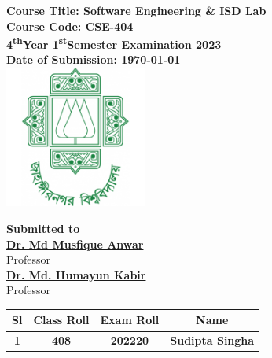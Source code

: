 \documentclass[a4paper,12pt]{article}
\begin{document}
\begin{center}
    \vspace{0.2cm}
    \textbf{\large{Course Title: Software Engineering \& ISD Lab}}\\
    \vspace{0.2cm}
    \textbf{Course Code: CSE-404}\\
    \vspace{0.2cm}
    \textbf{4\textsuperscript{th}Year 1\textsuperscript{st}Semester Examination 2023}\\
    \vspace{0.5cm}
    \textbf{Date of Submission: \today}\\

    \vspace{1.5cm}
    \includegraphics[width=0.35\textwidth]{images/logo.png}\\ %
    \vspace{1cm}

    \textbf{Submitted to}\\
    \vspace{0.2cm}
    \textbf{\href{https://juniv.edu/teachers/musfique.anwar}{Dr. Md Musfique Anwar}}\\
    {Professor}\\
    \vspace{0.2cm}
    \textbf{\href{https://juniv.edu/teachers/hkabir}{Dr. Md. Humayun Kabir}}\\
    {Professor}\\


    \vspace{1cm}

    \begin{table}[h!]
        \centering
        \begin{tabular}{|c|c|c|c|}
            \hline
            \rowcolor[HTML]{2F4F4F} %
            {\color[HTML]{FFFFFF}\textbf{Sl}}& {\color[HTML]{FFFFFF}\textbf{Class Roll}}& {\color[HTML]{FFFFFF}\textbf{Exam Roll}}& {\color[HTML]{FFFFFF}\textbf{Name}}\\ \hline
            \rowcolor[HTML]{B0E0E6}
            \textbf{1}& \textbf{408} & \textbf{202220} & \textbf{Sudipta Singha} \\ \hline


\end{tabular}
\end{table}
\end{center}
\end{document}
